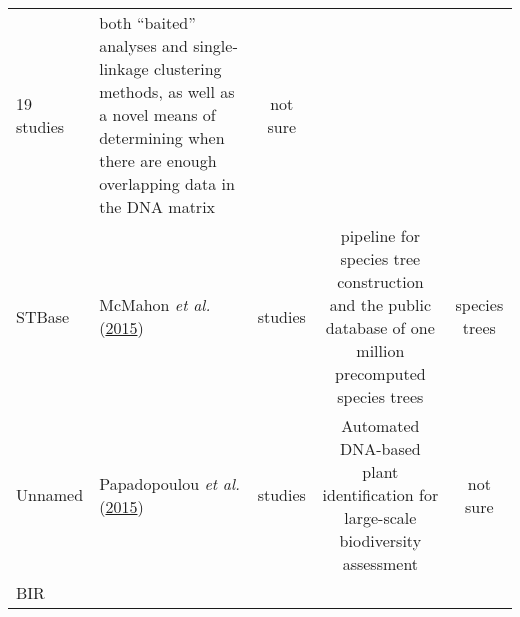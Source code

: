 \documentclass[]{article}
\begin{document}
\begin{longtable}[]{@{}llccc@{}}
\begin{minipage}[t]{0.20\columnwidth}
19 studies\strut
\end{minipage} & \begin{minipage}[t]{0.20\columnwidth}\centering
both ``baited'' analyses and single‐linkage clustering methods, as well as a novel means of determining when there are enough overlapping data in the DNA matrix\strut
\end{minipage} & \begin{minipage}[t]{0.20\columnwidth}\centering
not sure\strut
\end{minipage}\tabularnewline
\begin{minipage}[t]{0.12\columnwidth}\raggedright
STBase\strut
\end{minipage} & \begin{minipage}[t]{0.15\columnwidth}\raggedright
McMahon \emph{et al.} (\protect\hyperlink{ref-mcmahon2015stbase}{2015})\strut
\end{minipage} & \begin{minipage}[t]{0.20\columnwidth}\centering
7 studies\strut
\end{minipage} & \begin{minipage}[t]{0.20\columnwidth}\centering
pipeline for species tree construction and the public database of one million precomputed species trees\strut
\end{minipage} & \begin{minipage}[t]{0.20\columnwidth}\centering
species trees\strut
\end{minipage}\tabularnewline
\begin{minipage}[t]{0.12\columnwidth}\raggedright
Unnamed\strut
\end{minipage} & \begin{minipage}[t]{0.15\columnwidth}\raggedright
Papadopoulou \emph{et al.} (\protect\hyperlink{ref-papadopoulou2015automated}{2015})\strut
\end{minipage} & \begin{minipage}[t]{0.20\columnwidth}\centering
17 studies\strut
\end{minipage} & \begin{minipage}[t]{0.20\columnwidth}\centering
Automated DNA-based plant identification for large-scale biodiversity assessment\strut
\end{minipage} & \begin{minipage}[t]{0.20\columnwidth}\centering
not sure\strut
\end{minipage}\tabularnewline
\begin{minipage}[t]{0.12\columnwidth}\raggedright
BIR\strut

\end{minipage}
\end{longtable}
\end{document}
